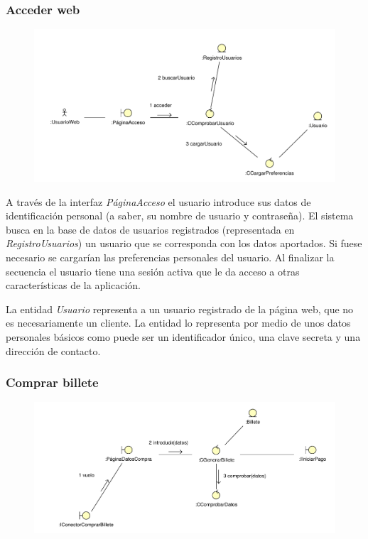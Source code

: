 \documentclass[11pt, a4paper, twoside, titlepage]{article}
\begin{document}
			\subsubsection{Acceder web}
				\begin{figure}[H]\centering
					\includegraphics[scale=.75]{diagramas/accederweb.pdf}
				\end{figure}

				A través de la interfaz {\itshape PáginaAcceso} el usuario introduce sus datos de identificación personal (a saber, su nombre de usuario y contraseña). El sistema busca en la base de datos de usuarios registrados (representada en {\itshape RegistroUsuarios}) un usuario que se corresponda con los datos aportados. Si fuese necesario se cargarían las preferencias personales del usuario. Al finalizar la secuencia el usuario tiene una sesión activa que le da acceso a otras características de la aplicación.

				La entidad {\itshape Usuario} representa a un usuario registrado de la página web, que no es necesariamente un cliente. La entidad lo representa por medio de unos datos personales básicos como puede ser un identificador único, una clave secreta y una dirección de contacto.

			\subsubsection{Comprar billete}
				\begin{figure}[H]\centering
					\includegraphics[scale=.72]{diagramas/comprarbillete.pdf}
				\end{figure}
\end{document}
